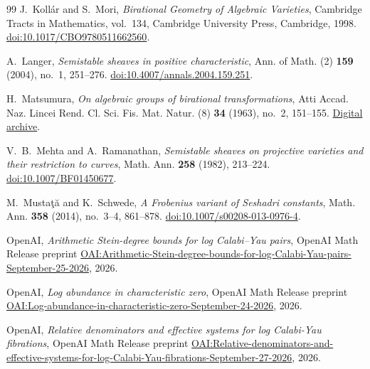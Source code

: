 \begin{thebibliography}{99}
J.~Koll\'ar and S.~Mori, \emph{Birational Geometry of Algebraic Varieties},
Cambridge Tracts in Mathematics, vol.~134,
Cambridge University Press, Cambridge, 1998.
\href{https://doi.org/10.1017/CBO9780511662560}{doi:10.1017/CBO9780511662560}.

A.~Langer, \emph{Semistable sheaves in positive characteristic},
Ann. of Math. (2) \textbf{159} (2004), no.~1, 251--276.
\href{https://doi.org/10.4007/annals.2004.159.251}{doi:10.4007/annals.2004.159.251}.

H.~Matsumura, \emph{On algebraic groups of birational transformations},
Atti Accad. Naz. Lincei Rend. Cl. Sci. Fis. Mat. Natur. (8)
\textbf{34} (1963), no.~2, 151--155.
\href{https://www.bdim.eu/item?id=RLINA_1963_8_34_2_151_0}{Digital archive}.

V.~B.~Mehta and A.~Ramanathan,
\emph{Semistable sheaves on projective varieties and their restriction to curves},
Math. Ann. \textbf{258} (1982), 213--224.
\href{https://doi.org/10.1007/BF01450677}{doi:10.1007/BF01450677}.

M.~Musta\c{t}\u{a} and K.~Schwede,
\emph{A Frobenius variant of Seshadri constants},
Math. Ann. \textbf{358} (2014), no.~3--4, 861--878.
\href{https://doi.org/10.1007/s00208-013-0976-4}{doi:10.1007/s00208-013-0976-4}.

OpenAI, \emph{Arithmetic Stein-degree bounds for log Calabi--Yau pairs},
OpenAI Math Release preprint
\href{https://github.com/openai/math/blob/main/preprints/Arithmetic-Stein-degree-bounds-for-log-Calabi-Yau-pairs-September-25-2026/paper.pdf}{OAI:Arithmetic-Stein-degree-bounds-for-log-Calabi-Yau-pairs-September-25-2026},
2026.

OpenAI, \emph{Log abundance in characteristic zero},
OpenAI Math Release preprint
\href{https://github.com/openai/math/blob/main/preprints/Log-abundance-in-characteristic-zero-September-24-2026/paper.pdf}{OAI:Log-abundance-in-characteristic-zero-September-24-2026},
2026.

OpenAI, \emph{Relative denominators and effective systems for log Calabi-Yau fibrations},
OpenAI Math Release preprint
\href{https://github.com/openai/math/blob/main/preprints/Relative-denominators-and-effective-systems-for-log-Calabi-Yau-fibrations-September-27-2026/paper.pdf}{OAI:Relative-denominators-and-effective-systems-for-log-Calabi-Yau-fibrations-September-27-2026},
2026.


\end{thebibliography}
